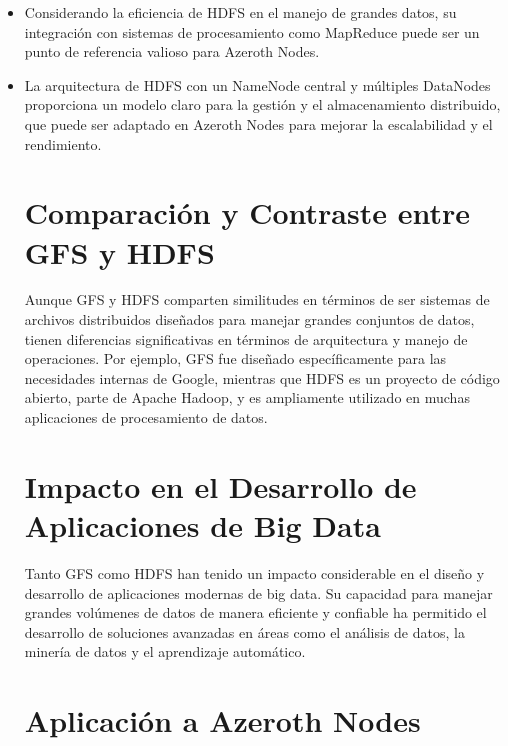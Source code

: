 \begin{itemize}
    \item Considerando la eficiencia de HDFS en el manejo de grandes datos, su integración con sistemas de procesamiento como MapReduce puede ser un punto de referencia valioso para Azeroth Nodes.
    \item La arquitectura de HDFS con un NameNode central y múltiples DataNodes proporciona un modelo claro para la gestión y el almacenamiento distribuido, que puede ser adaptado en Azeroth Nodes para mejorar la escalabilidad y el rendimiento.
\section{Comparación y Contraste entre GFS y HDFS}

Aunque GFS y HDFS comparten similitudes en términos de ser sistemas de archivos distribuidos diseñados para manejar grandes conjuntos de datos, tienen diferencias significativas en términos de arquitectura y manejo de operaciones. Por ejemplo, GFS fue diseñado específicamente para las necesidades internas de Google, mientras que HDFS es un proyecto de código abierto, parte de Apache Hadoop, y es ampliamente utilizado en muchas aplicaciones de procesamiento de datos.

\section{Impacto en el Desarrollo de Aplicaciones de Big Data}

Tanto GFS como HDFS han tenido un impacto considerable en el diseño y desarrollo de aplicaciones modernas de big data. Su capacidad para manejar grandes volúmenes de datos de manera eficiente y confiable ha permitido el desarrollo de soluciones avanzadas en áreas como el análisis de datos, la minería de datos y el aprendizaje automático.

\section{Aplicación a Azeroth Nodes}


\end{itemize}
